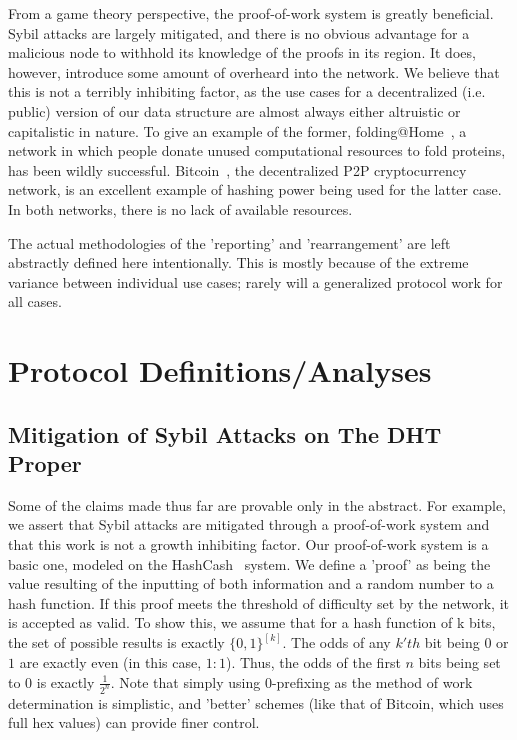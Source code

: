 \documentclass[10pt]{IEEEtran}
\begin{document}
\par From a game theory perspective, the proof-of-work system is greatly beneficial. Sybil attacks are largely mitigated, and there is no obvious advantage for a malicious node to withhold its knowledge of the proofs in its region. It does, however, introduce some amount of overheard into the network. We believe that this is not a terribly inhibiting factor, as the use cases for a decentralized (i.e. public) version of our data structure are almost always either altruistic or capitalistic in nature. To give an example of the former, folding@Home~\cite{Anderson:2002vr}, a network in which people donate unused computational resources to fold proteins, has been wildly successful. Bitcoin~\cite{Nakamoto:2008ti}, the decentralized P2P cryptocurrency network, is an excellent example of hashing power being used for the latter case. In both networks, there is no lack of available resources.

\par The actual methodologies of the 'reporting' and 'rearrangement' are left abstractly defined here intentionally. This is mostly because of the extreme variance between individual use cases; rarely will a generalized protocol work for all cases.

\section{Protocol Definitions/Analyses}
\subsection{Mitigation of Sybil Attacks on The DHT Proper}
\par Some of the claims made thus far are provable only in the abstract. For example, we assert that Sybil attacks are mitigated through a proof-of-work system and that this work is not a growth inhibiting factor. Our proof-of-work system is a basic one, modeled on the HashCash~\cite{Back:2002vq} system. We define a 'proof' as being the value resulting of the inputting of both information and a random number to a hash function. If this proof meets the threshold of difficulty set by the network, it is accepted as valid. To show this, we assume that for a hash function of k bits, the set of possible results is exactly $\{0,1\}^{[k]}$. The odds of any $k'th$ bit being $0$ or $1$ are exactly even (in this case, $1:1$). Thus, the odds of the first $n$ bits being set to 0 is exactly $\frac{1}{2^n}$. Note that simply using $0$-prefixing as the method of work determination is simplistic, and 'better' schemes (like that of Bitcoin, which uses full hex values) can provide finer control. 
\end{document}
